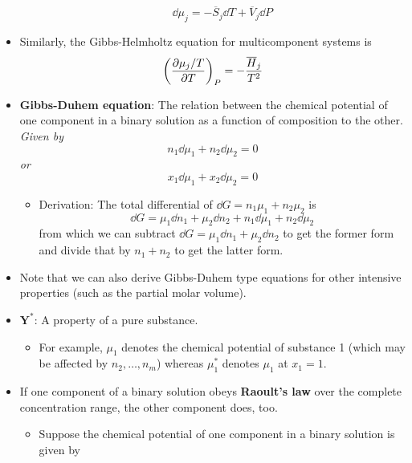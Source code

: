 \documentclass[../notes.tex]{subfiles}
\begin{document}
\begin{itemize}
\begin{itemize}
\begin{equation*}
            \dd{\mu_j} = -\overline{S}_j\dd{T}+\overline{V}_j\dd{P}
        \end{equation*}
    \end{itemize}
    \item Similarly, the Gibbs-Helmholtz equation for multicomponent systems is
    \begin{equation*}
        \left( \pdv{\mu_j/T}{T} \right)_P = -\frac{\overline{H}_j}{T^2}
    \end{equation*}
    \item \textbf{Gibbs-Duhem equation}: The relation between the chemical potential of one component in a binary solution as a function of composition to the other. \emph{Given by}
    \begin{equation*}
        n_1\dd{\mu_1}+n_2\dd{\mu_2} = 0
    \end{equation*}
    \emph{or}
    \begin{equation*}
        x_1\dd{\mu_1}+x_2\dd{\mu_2} = 0
    \end{equation*}
    \begin{itemize}
        \item Derivation: The total differential of $\dd{G}=n_1\mu_1+n_2\mu_2$ is
        \begin{equation*}
            \dd{G} = \mu_1\dd{n_1}+\mu_2\dd{n_2}+n_1\dd{\mu_1}+n_2\dd{\mu_2}
        \end{equation*}
        from which we can subtract $\dd{G}=\mu_1\dd{n_1}+\mu_2\dd{n_2}$ to get the former form and divide that by $n_1+n_2$ to get the latter form.
    \end{itemize}
    \item Note that we can also derive Gibbs-Duhem type equations for other intensive properties (such as the partial molar volume).
    \item $\bm{Y^*}$: A property of a pure substance.
    \begin{itemize}
        \item For example, $\mu_1$ denotes the chemical potential of substance 1 (which may be affected by $n_2,\dots,n_m$) whereas $\mu_1^*$ denotes $\mu_1$ at $x_1=1$.
    \end{itemize}
    \item If one component of a binary solution obeys \textbf{Raoult's law} over the complete concentration range, the other component does, too.
    \begin{itemize}
        \item Suppose the chemical potential of one component in a binary solution is given by

\end{itemize}
\end{itemize}
\end{document}
